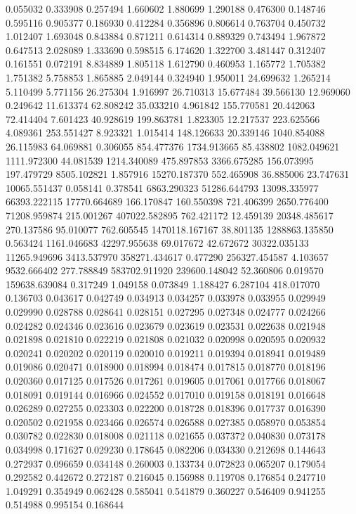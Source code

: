 0.055032
0.333908
0.257494
1.660602
1.880699
1.290188
0.476300
0.148746
0.595116
0.905377
0.186930
0.412284
0.356896
0.806614
0.763704
0.450732
1.012407
1.693048
0.843884
0.871211
0.614314
0.889329
0.743494
1.967872
0.647513
2.028089
1.333690
0.598515
6.174620
1.322700
3.481447
0.312407
0.161551
0.072191
8.834889
1.805118
1.612790
0.460953
1.165772
1.705382
1.751382
5.758853
1.865885
2.049144
0.324940
1.950011
24.699632
1.265214
5.110499
5.771156
26.275304
1.916997
26.710313
15.677484
39.566130
12.969060
0.249642
11.613374
62.808242
35.033210
4.961842
155.770581
20.442063
72.414404
7.601423
40.928619
199.863781
1.823305
12.217537
223.625566
4.089361
253.551427
8.923321
1.015414
148.126633
20.339146
1040.854088
26.115983
64.069881
0.306055
854.477376
1734.913665
85.438802
1082.049621
1111.972300
44.081539
1214.340089
475.897853
3366.675285
156.073995
197.479729
8505.102821
1.857916
15270.187370
552.465908
36.885006
23.747631
10065.551437
0.058141
0.378541
6863.290323
51286.644793
13098.335977
66393.222115
17770.664689
166.170847
160.550398
721.406399
2650.776400
71208.959874
215.001267
407022.582895
762.421172
12.459139
20348.485617
270.137586
95.010077
762.605545
1470118.167167
38.801135
1288863.135850
0.563424
1161.046683
42297.955638
69.017672
42.672672
30322.035133
11265.949696
3413.537970
358271.434617
0.477290
256327.454587
4.103657
9532.666402
277.788849
583702.911920
239600.148042
52.360806
0.019570
159638.639084
0.317249
1.049158
0.073849
1.188427
6.287104
418.017070
0.136703
0.043617
0.042749
0.034913
0.034257
0.033978
0.033955
0.029949
0.029990
0.028788
0.028641
0.028151
0.027295
0.027348
0.024777
0.024266
0.024282
0.024346
0.023616
0.023679
0.023619
0.023531
0.022638
0.021948
0.021898
0.021810
0.022219
0.021808
0.021032
0.020998
0.020595
0.020932
0.020241
0.020202
0.020119
0.020010
0.019211
0.019394
0.018941
0.019489
0.019086
0.020471
0.018900
0.018994
0.018474
0.017815
0.018770
0.018196
0.020360
0.017125
0.017526
0.017261
0.019605
0.017061
0.017766
0.018067
0.018091
0.019144
0.016966
0.024552
0.017010
0.019158
0.018191
0.016648
0.026289
0.027255
0.023303
0.022200
0.018728
0.018396
0.017737
0.016390
0.020502
0.021958
0.023466
0.026574
0.026588
0.027385
0.058970
0.053854
0.030782
0.022830
0.018008
0.021118
0.021655
0.037372
0.040830
0.073178
0.034998
0.171627
0.029230
0.178645
0.082206
0.034330
0.212698
0.144643
0.272937
0.096659
0.034148
0.260003
0.133734
0.072823
0.065207
0.179054
0.292582
0.442672
0.272187
0.216045
0.156988
0.119708
0.176854
0.247710
1.049291
0.354949
0.062428
0.585041
0.541879
0.360227
0.546409
0.941255
0.514988
0.995154
0.168644
